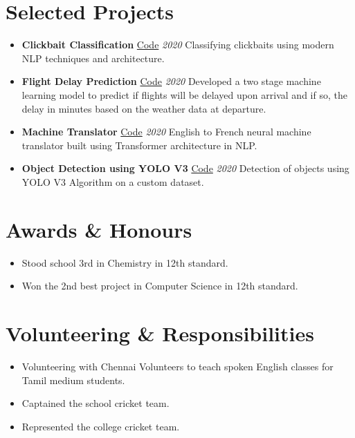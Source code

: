 \documentclass[letterpaper,10pt]{article}
\newenvironment{cvitemize}{
    \begin{itemize}[leftmargin=10pt,label={},afterlabel={},after=\vspace{-12pt}]
}{
    \end{itemize}
}
\newcommand{\point}{\raisebox{0.1\height}{$\rightarrow$}\hspace{4pt}}
\begin{document}
\section*{Selected Projects}
\begin{cvitemize}
    \item{
        \textbf{Clickbait Classification} \hfill \faGithub \enspace \href{https://github.com/MBadriNarayanan/ClickbaitClassification}{Code} \enspace \textit{2020} \newline
        Classifying clickbaits using modern NLP techniques and architecture.
    }
    \item{
        \textbf{Flight Delay Prediction} \hfill \faGithub \enspace \href{https://github.com/MBadriNarayanan/FlightDelayPrediction}{Code} \enspace \textit{2020} \newline
        Developed a two stage machine learning model to predict if flights will be delayed upon arrival and if so, the delay in minutes based on the weather data at departure.
    }
    \item{
        \textbf{Machine Translator} \hfill \faGithub \enspace \href{https://github.com/MBadriNarayanan/MachineTranslation}{Code} \enspace \textit{2020} \newline
        English to French neural machine translator built using Transformer architecture in NLP.
    }
    \item{
        \textbf{Object Detection using YOLO V3} \hfill \faGithub \enspace \href{https://github.com/MBadriNarayanan/ObjectDetectionUsingYOLOv3}{Code} \enspace \textit{2020} \newline
        Detection of objects using YOLO V3 Algorithm on a custom dataset.
    }
\end{cvitemize}

\newpage
\section*{Awards \& Honours}
\begin{cvitemize}
    \item \point Stood school 3rd in Chemistry in 12th standard.
    \item \point Won the 2nd best project in Computer Science in 12th standard.
\end{cvitemize}

\section*{Volunteering \& Responsibilities}
\begin{cvitemize}
    \item \point Volunteering with Chennai Volunteers to teach spoken English classes for Tamil medium students.
    \item \point Captained the school cricket team.
    \item \point Represented the college cricket team.
\end{cvitemize}
\end{document}
